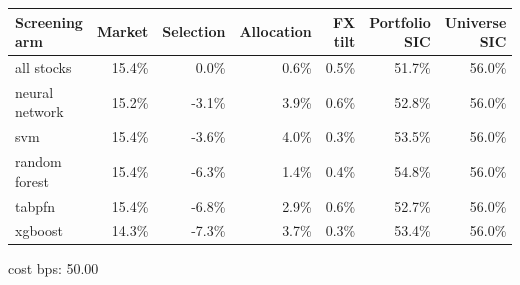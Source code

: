 \begin{threeparttable}
\footnotesize
\setlength{\tabcolsep}{4pt}
\begin{tabularx}{\linewidth}{>{\raggedright\arraybackslash}Xrrrrrr}
\toprule
Screening arm & Market & Selection & Allocation & FX tilt & Portfolio SIC & Universe SIC \\
\midrule
all stocks & 15.4\% & 0.0\% & 0.6\% & 0.5\% & 51.7\% & 56.0\% \\
neural network & 15.2\% & -3.1\% & 3.9\% & 0.6\% & 52.8\% & 56.0\% \\
svm & 15.4\% & -3.6\% & 4.0\% & 0.3\% & 53.5\% & 56.0\% \\
random forest & 15.4\% & -6.3\% & 1.4\% & 0.4\% & 54.8\% & 56.0\% \\
tabpfn & 15.4\% & -6.8\% & 2.9\% & 0.6\% & 52.7\% & 56.0\% \\
xgboost & 14.3\% & -7.3\% & 3.7\% & 0.3\% & 53.4\% & 56.0\% \\
\bottomrule
\end{tabularx}
\begin{tablenotes}[flushleft]\footnotesize
  \item cost bps: 50.00
\end{tablenotes}
\end{threeparttable}
